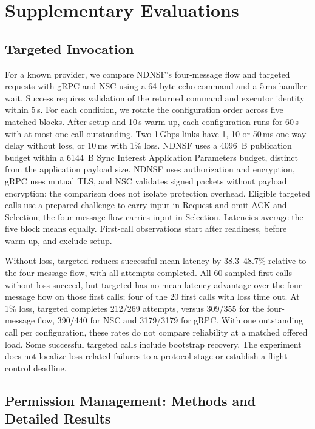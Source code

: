 \section{Supplementary Evaluations}
\label{app:supplemental}


\subsection{Targeted Invocation}
\label{sec:targeted-invocation-evaluation}

For a known provider, we compare NDNSF's four-message flow and targeted requests with gRPC and NSC using a 64-byte echo command and a 5\,ms handler wait. Success requires validation of the returned command and executor identity within 5\,s. For each condition, we rotate the configuration order across five matched blocks. After setup and 10\,s warm-up, each configuration runs for 60\,s with at most one call outstanding. Two 1\,Gbps links have 1, 10 or 50\,ms one-way delay without loss, or 10\,ms with 1\% loss. NDNSF uses a 4096~B publication budget within a 6144~B Sync Interest Application Parameters budget, distinct from the application payload size. NDNSF uses authorization and encryption, gRPC uses mutual TLS, and NSC validates signed packets without payload encryption; the comparison does not isolate protection overhead. Eligible targeted calls use a prepared challenge to carry input in Request and omit ACK and Selection; the four-message flow carries input in Selection. Latencies average the five block means equally. First-call observations start after readiness, before warm-up, and exclude setup.

Without loss, targeted reduces successful mean latency by 38.3--48.7\% relative to the four-message flow, with all attempts completed. All 60 sampled first calls without loss succeed, but targeted has no mean-latency advantage over the four-message flow on those first calls; four of the 20 first calls with loss time out. At 1\% loss, targeted completes 212/269 attempts, versus 309/355 for the four-message flow, 390/440 for NSC and 3179/3179 for gRPC. With one outstanding call per configuration, these rates do not compare reliability at a matched offered load. Some successful targeted calls include bootstrap recovery. The experiment does not localize loss-related failures to a protocol stage or establish a flight-control deadline.

\subsection{Permission Management: Methods and Detailed Results}
\label{app:measured-permission-cost}

